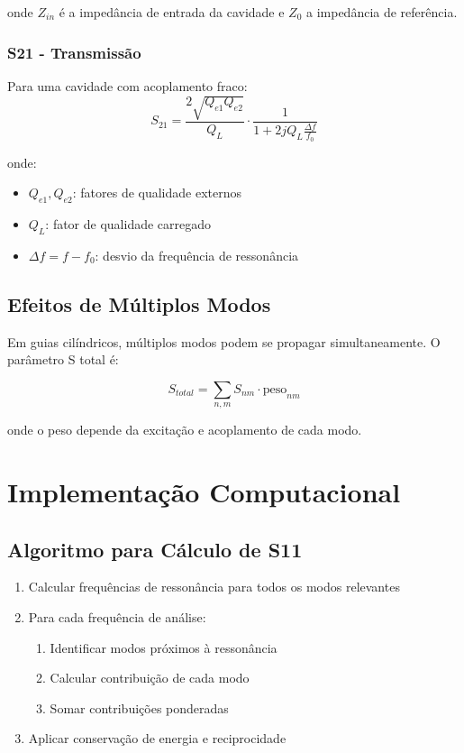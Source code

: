 \documentclass[a4paper,12pt]{article}
\begin{document}
onde $Z_{in}$ é a impedância de entrada da cavidade e $Z_0$ a impedância de referência.

\subsubsection{S21 - Transmissão}
Para uma cavidade com acoplamento fraco:
\begin{equation}
S_{21} = \frac{2\sqrt{Q_{e1}Q_{e2}}}{Q_L} \cdot \frac{1}{1 + 2jQ_L\frac{\Delta f}{f_0}}
\end{equation}

onde:
\begin{itemize}
    \item $Q_{e1}, Q_{e2}$: fatores de qualidade externos
    \item $Q_L$: fator de qualidade carregado
    \item $\Delta f = f - f_0$: desvio da frequência de ressonância
\end{itemize}

\subsection{Efeitos de Múltiplos Modos}
Em guias cilíndricos, múltiplos modos podem se propagar simultaneamente. O parâmetro S total é:

\begin{equation}
S_{total} = \sum_{n,m} S_{nm} \cdot \text{peso}_{nm}
\end{equation}

onde o peso depende da excitação e acoplamento de cada modo.

\section{Implementação Computacional}

\subsection{Algoritmo para Cálculo de S11}
\begin{enumerate}
    \item Calcular frequências de ressonância para todos os modos relevantes
    \item Para cada frequência de análise:
    \begin{enumerate}
        \item Identificar modos próximos à ressonância
        \item Calcular contribuição de cada modo
        \item Somar contribuições ponderadas
    \end{enumerate}
    \item Aplicar conservação de energia e reciprocidade
\end{enumerate}
\end{document}
